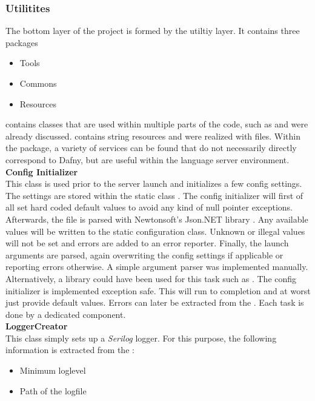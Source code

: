 \subsubsection{Utilitites}
The bottom layer of the project is formed by the utiltiy layer.
It contains three packages
\begin{itemize}
    \item Tools
    \item Commons
    \item Resources
\end{itemize}
 contains classes that are used within multiple parts of the code, such as  and were already discussed.
 contains string resources and were realized with  files.
Within the  package,
a variety of services can be found that do not necessarily directly correspond to Dafny,
but are useful within the language server environment.\\

\textbf{Config Initializer}\\
This class is used prior to the server launch and initializes a few config settings.
The settings are stored within the static class .
The config initializer will first of all set hard coded default values to avoid any kind of null pointer exceptions.
Afterwards, the file  is parsed with Newtonsoft's Json.NET library \cite{jsondotnet}.
Any available values will be written to the static configuration class.
Unknown or illegal values will not be set and errors are added to an error reporter.
Finally, the launch arguments are parsed, again overwriting the config settings if applicable or reporting errors otherwise.
A simple argument parser was implemented manually.
Alternatively, a library could have been used for this task such as \cite{clparser}.
The config initializer is implemented exception safe.
This will run to completion and at worst just provide default values.
Errors can later be extracted from the .
Each task is done by a dedicated component.\\

\textbf{LoggerCreator}\\
This class simply sets up a \textit{Serilog} \cite{serilog} logger.
For this purpose, the following information is extracted from the :
\begin{itemize}
    \item Minimum loglevel
    \item Path of the logfile
\end{itemize}

